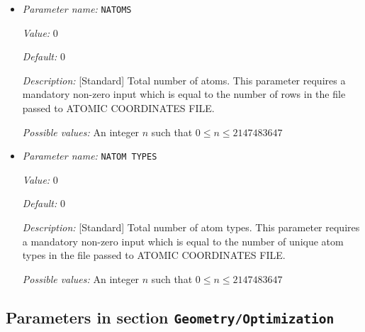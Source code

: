 \begin{itemize}
{\it Possible values:} Any string
\item {\it Parameter name:} {\tt NATOMS}
\label{parameters:Geometry/NATOMS}


{\it Value:} 0


{\it Default:} 0


{\it Description:} [Standard] Total number of atoms. This parameter requires a mandatory non-zero input which is equal to the number of rows in the file passed to ATOMIC COORDINATES FILE.


{\it Possible values:} An integer $n$ such that $0\leq n \leq 2147483647$
\item {\it Parameter name:} {\tt NATOM TYPES}
\label{parameters:Geometry/NATOM TYPES}
\label{parameters:Geometry/NATOM_20TYPES}


{\it Value:} 0


{\it Default:} 0


{\it Description:} [Standard] Total number of atom types. This parameter requires a mandatory non-zero input which is equal to the number of unique atom types in the file passed to ATOMIC COORDINATES FILE.


{\it Possible values:} An integer $n$ such that $0\leq n \leq 2147483647$
\end{itemize}



\subsection{Parameters in section \tt Geometry/Optimization}
\label{parameters:Geometry/Optimization}

